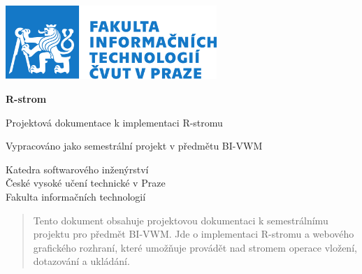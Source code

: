 \documentclass[a4paper,10pt]{article}
\title{}
\author{Jan Toušek}
\author{Ladislav Prix}
\author{
  Toušek, Jan\\
  \texttt{touseja4@fit.cvut.cz}
  \and
  Prix, Ladislav\\
  \texttt{prixladi@fit.cvut.cz}
}
\begin{document}
\begin{titlepage}
   \begin{center}
       \vspace*{0.5cm}
       \includegraphics[width=0.6\textwidth]{logo_FIT.pdf}
       
       \vspace{2cm}
       \textbf{R-strom}
 
       \vspace{0.5cm}
       Projektová dokumentace k implementaci R-stromu
 
        {\let\newpage\relax\maketitle}
       \maketitle

       \vfill
 
       Vypracováno jako semestrální projekt v předmětu BI-VWM\\
 
       \vspace{0.8cm}
 

 
       Katedra softwarového inženýrství\\
       České vysoké učení technické v Praze\\
       Fakulta informačních technologií\\
 
   \end{center}
\end{titlepage}


\clearpage
\begin{abstract}
Tento dokument obsahuje projektovou dokumentaci k semestrálnímu projektu pro předmět BI-VWM. Jde o implementaci R-stromu a webového grafického rozhraní, které umožňuje provádět nad stromem operace vložení, dotazování a ukládání.
\end{abstract}
\end{document}

